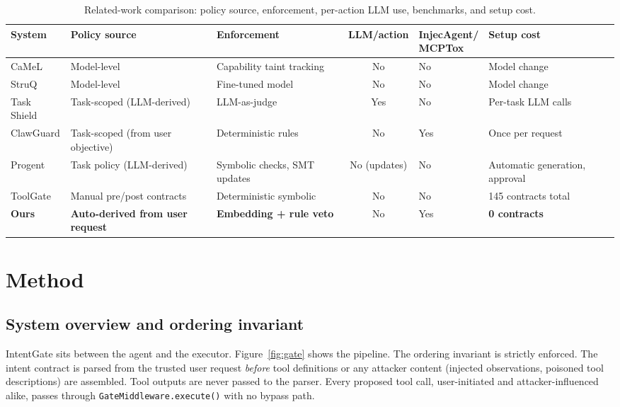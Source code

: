 \documentclass[a4paper,conference]{IEEEtran}
\begin{document}
\begin{table}[t]
  \caption{Related-work comparison: policy source, enforcement, per-action LLM use, benchmarks, and setup cost.}
  \label{tab:relatedwork}
  \centering
  \footnotesize
  \setlength{\tabcolsep}{4pt}
  \begin{tabular}{|p{56pt}|p{82pt}|p{92pt}|c|p{88pt}|p{88pt}|}
    \hline
    System        & Policy source                           & Enforcement                    & LLM/action   & \shortstack{InjecAgent/                                  \\MCPTox} & Setup cost \\
    \hline
    CaMeL         & Model-level                             & Capability taint tracking      & No           & No                      & Model change                   \\
    \hline
    StruQ         & Model-level                             & Fine-tuned model               & No           & No                      & Model change                   \\
    \hline
    Task Shield   & Task-scoped (LLM-derived)               & LLM-as-judge                   & Yes          & No                      & Per-task LLM calls             \\
    \hline
    ClawGuard     & Task-scoped (from user objective)       & Deterministic rules            & No           & Yes                     & Once per request               \\
    \hline
    Progent       & Task policy (LLM-derived)               & Symbolic checks, SMT updates   & No (updates) & No                      & Automatic generation, approval \\
    \hline
    ToolGate      & Manual pre/post contracts               & Deterministic symbolic         & No           & No                      & 145 contracts total            \\
    \hline
    \textbf{Ours} & \textbf{Auto-derived from user request} & \textbf{Embedding + rule veto} & No           & Yes                     & \textbf{0 contracts}           \\
    \hline
  \end{tabular}
\end{table}

\section{Method}

\subsection{System overview and ordering invariant}
IntentGate sits between the agent and the executor. Figure~\ref{fig:gate} shows the pipeline. The ordering invariant is strictly enforced. The intent contract is parsed from the trusted user request \emph{before} tool definitions or any attacker content (injected observations, poisoned tool descriptions) are assembled. Tool outputs are never passed to the parser. Every proposed tool call, user-initiated and attacker-influenced alike, passes through \texttt{GateMiddleware.execute()} with no bypass path.
\end{document}
